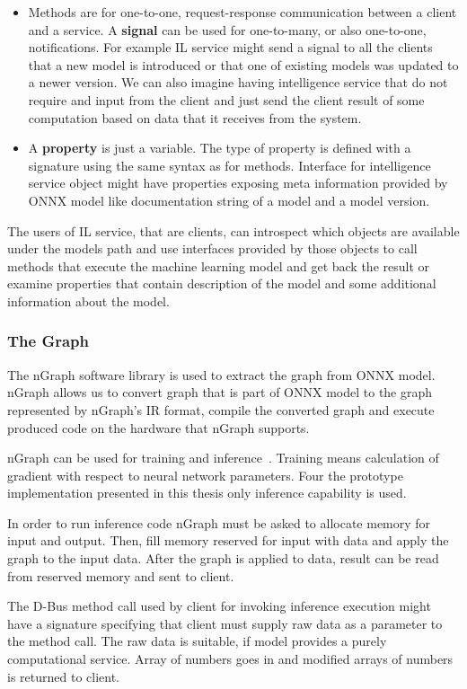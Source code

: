 \documentclass[english, 12pt, a4paper, elec, utf8, online]{aaltothesis}
\begin{document}
\begin{itemize}
\item
Methods are for one-to-one, request-response communication between a client and a service. A \textbf{signal} can be used for one-to-many, or also one-to-one, notifications. For example IL service might send a signal to all the clients that a new model is introduced or that one of existing models was updated to a newer version. We can also imagine having intelligence service that do not require and input from the client and just send the client result of some computation based on data that it receives from the system. 
\item 
A \textbf{property} is just a variable. The type of property is defined with a signature using the same syntax as for methods. Interface for intelligence service object might have properties exposing meta information provided by ONNX model like documentation string of a model and a model version.        
\end{itemize}

The users of IL service, that are clients, can introspect which objects are available under the models path and use interfaces provided by those objects to call methods that execute the machine learning model and get back the result or examine properties that contain description of the model and some additional information about the model.       


\subsubsection{The Graph}
The nGraph software library is used to extract the graph from ONNX model. nGraph allows us to convert graph that is part of ONNX model to the graph represented by nGraph's  IR format, compile the converted graph and execute produced code on the hardware that nGraph supports. 

nGraph can be used for training and inference~\cite{cyphers2018intel}. Training means calculation of gradient with respect to neural network parameters. Four the prototype implementation presented in this thesis only inference capability is used. 

In order to run inference code nGraph must be asked to allocate memory for input and output. Then, fill memory reserved for input with data and apply the graph to the input data. After the graph is applied to data, result can be read from reserved memory and sent to client. 

The D-Bus method call used by client for invoking inference execution might have a signature specifying that client must supply raw data as a parameter to the method call. The raw data is suitable, if model provides a purely computational service. Array of numbers goes in and modified arrays of numbers is returned to client. 
\end{document}
